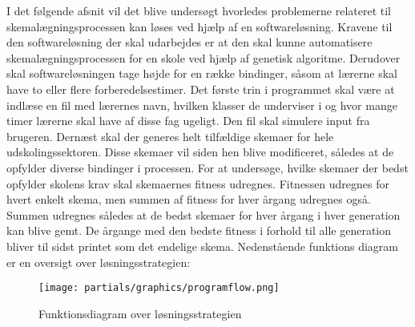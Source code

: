 I det følgende afsnit vil det blive undersøgt hvorledes problemerne relateret til skemalægningsprocessen kan løses ved hjælp af en softwareløsning. 
Kravene til den softwareløsning der skal udarbejdes er at den skal kunne automatisere skemalægningsprocessen for en skole ved hjælp af genetisk algoritme. Derudover skal softwareløsningen tage højde for en række bindinger, såsom at lærerne skal have to eller flere forberedelsestimer. 
Det første trin i programmet skal være at indlæse en fil med lærernes navn, hvilken klasser de underviser i og hvor mange timer lærerne skal have af disse fag ugeligt. Den fil skal simulere input fra brugeren. 
Dernæst skal der generes helt tilfældige skemaer for hele udskolingssektoren. Disse skemaer vil siden hen blive modificeret, således at de opfylder diverse bindinger i processen. For at undersøge, hvilke skemaer der bedst opfylder skolens krav skal skemaernes fitness udregnes. Fitnessen udregnes for hvert enkelt skema, men summen af fitness for hver årgang udregnes også. Summen udregnes således at de bedst skemaer for hver årgang i hver generation kan blive gemt. De årgange med den bedste fitness i forhold til alle generation bliver til sidst printet som det endelige skema. Nedenstående funktions diagram er en oversigt over løsningsstrategien:
\begin{figure}[!h]
  \centering
  \texttt{[image: partials/graphics/programflow.png]}
    \caption{Funktionsdiagram over løsningsstrategien}
  \label{fig:løsningsstrategi}
\end{figure}